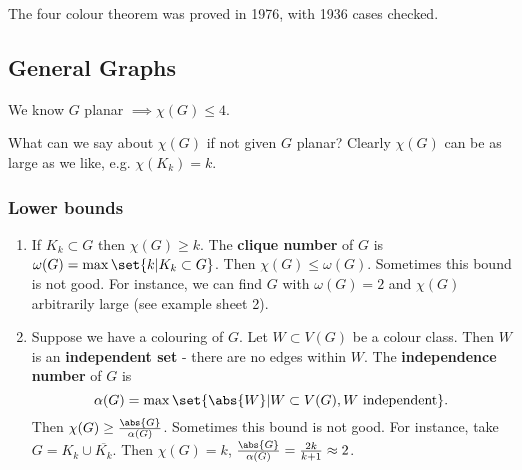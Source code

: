 \documentclass{article}
\begin{document}
The four colour theorem was proved in 1976, with 1936 cases checked.

\subsection{General Graphs}
We know $G$ planar $\implies \chi(G) \leq 4$.

What can we say about $\chi(G)$ if not given $G$ planar?
Clearly $\chi(G)$ can be as large as we like, e.g. $\chi(K_k) = k$.

\subsubsection{Lower bounds}
\begin{enumerate}[label=(\alph*)]
    \item If $K_k \subset G$ then $\chi(G) \geq k$.
        The \textbf{clique number} of $G$ is $\omega(G) = \max\set{k | K_k \subset G}$. Then $\chi(G) \leq \omega(G)$.
        Sometimes this bound is not good. For instance, we can find $G$ with $\omega(G) = 2$ and $\chi(G)$ arbitrarily large (see example sheet 2).
    \item Suppose we have a colouring of $G$. Let $W \subset V(G)$ be a colour class. Then $W$ is an \textbf{independent set} - there are no edges within $W$.
        The \textbf{independence number} of $G$ is
        \begin{equation*}
            \alpha(G) = \max\set{\abs{W} | W \subset V(G), W \text{ independent}}.
        \end{equation*}
        Then $\chi(G) \geq \frac{\abs{G}}{\alpha(G)}$.
        Sometimes this bound is not good.
        For instance, take $G = K_k \cup \overline{K_k}$.
        Then $\chi(G) = k$, $\frac{\abs{G}}{\alpha(G)} = \frac{2k}{k+1} \approx 2$.
\end{enumerate}
\end{document}
